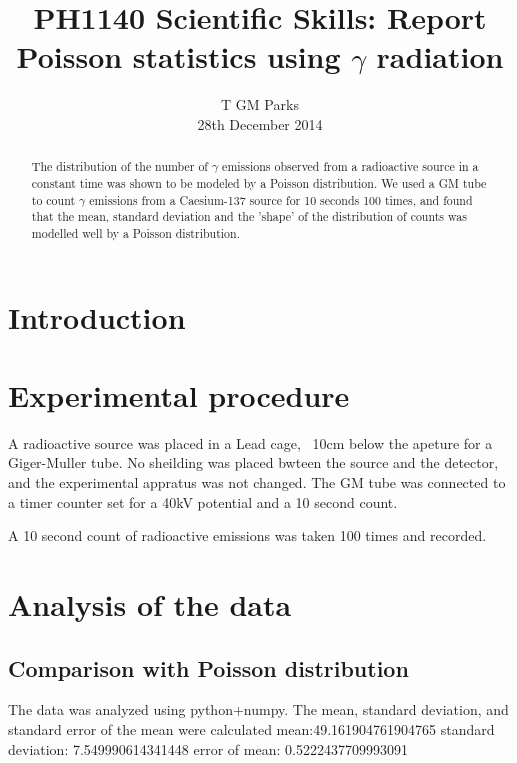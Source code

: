 \documentclass[10pt]{iopart}
\begin{document}
\title[PH1140 Report - T GM Parks]{PH1140 Scientific Skills: Report Poisson statistics using $\gamma$ radiation}

\author{T GM Parks\\28th December 2014}

\begin{abstract}
The distribution of the number of $\gamma$ emissions observed from a radioactive source in a constant time was shown to be modeled by a Poisson distribution. We used a GM tube to count $\gamma$ emissions from a Caesium-137 source for 10 seconds 100 times, and found that the mean, standard deviation and the 'shape' of the distribution of counts was modelled well by a Poisson distribution.
\end{abstract}


\section{Introduction}

\section{Experimental procedure}

A radioactive source was placed in a Lead cage, ~10cm below the apeture for a Giger-Muller tube. No sheilding was placed bwteen the source and the detector, and the experimental appratus was not changed. The GM tube was connected to a timer counter set for a 40kV potential and a 10 second count.

A 10 second count of radioactive emissions was taken 100 times and recorded.

\section{Analysis of the data}

\subsection{Comparison with Poisson distribution}

The data was analyzed using python+numpy. The mean, standard deviation, and standard error of the mean were calculated
mean:49.161904761904765
standard deviation: 7.549990614341448
error of mean: 0.5222437709993091
\end{document}
